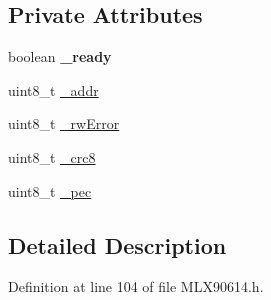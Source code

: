 \subsection*{Private Attributes}
\begin{DoxyCompactItemize}
\item 
\hypertarget{class_m_l_x90614_abcc1f76b9f1c99ae25e365736616679a}{boolean {\bfseries \-\_\-ready}}\label{class_m_l_x90614_abcc1f76b9f1c99ae25e365736616679a}

\item 
uint8\-\_\-t \hyperlink{class_m_l_x90614_a768925264f76f33f9bf98aec1cbec6a9}{\-\_\-addr}
\item 
uint8\-\_\-t \hyperlink{class_m_l_x90614_a8c203cc9359c283d07682ba7dbcc5de3}{\-\_\-rw\-Error}
\item 
uint8\-\_\-t \hyperlink{class_m_l_x90614_add210d34992507e8ccb753a040b14395}{\-\_\-crc8}
\item 
uint8\-\_\-t \hyperlink{class_m_l_x90614_a2526978eb988a8712baee6dca596be15}{\-\_\-pec}
\end{DoxyCompactItemize}


\subsection{Detailed Description}


Definition at line 104 of file M\-L\-X90614.\-h.



